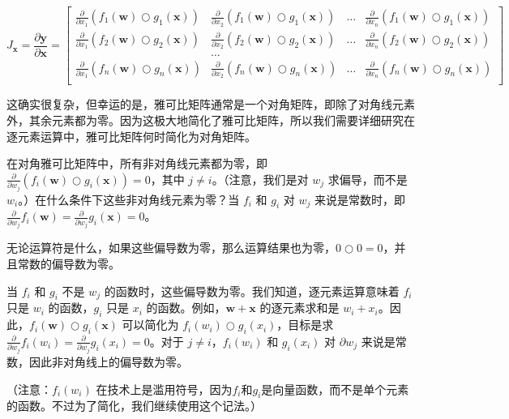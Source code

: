 \documentclass[11pt]{article}
\begin{document}
\[
J_\mathbf{x} = 
\frac{\partial \mathbf{y}}{\partial \mathbf{x}}  = \begin{bmatrix}
\frac{\partial}{\partial x_1} ( f_{1}(\mathbf{w}) \bigcirc g_{1}(\mathbf{x}) ) & \frac{\partial}{\partial x_2} ( f_{1}(\mathbf{w}) \bigcirc g_{1}(\mathbf{x}) ) & \ldots & \frac{\partial}{\partial x_n} ( f_{1}(\mathbf{w}) \bigcirc g_{1}(\mathbf{x}) )\\
\frac{\partial}{\partial x_1} ( f_{2}(\mathbf{w}) \bigcirc g_{2}(\mathbf{x}) ) & \frac{\partial}{\partial x_2} ( f_{2}(\mathbf{w}) \bigcirc g_{2}(\mathbf{x}) ) & \ldots & \frac{\partial}{\partial x_n} ( f_{2}(\mathbf{w}) \bigcirc g_{2}(\mathbf{x}) )\\
& \ldots\\
\frac{\partial}{\partial x_1} ( f_{n}(\mathbf{w}) \bigcirc g_{n}(\mathbf{x}) ) & \frac{\partial}{\partial x_2} ( f_{n}(\mathbf{w}) \bigcirc g_{n}(\mathbf{x}) ) & \ldots & \frac{\partial}{\partial x_n} ( f_{n}(\mathbf{w}) \bigcirc g_{n}(\mathbf{x}) )\\
\end{bmatrix}
\]

这确实很复杂，但幸运的是，雅可比矩阵通常是一个对角矩阵，即除了对角线元素外，其余元素都为零。因为这极大地简化了雅可比矩阵，所以我们需要详细研究在逐元素运算中，雅可比矩阵何时简化为对角矩阵。

在对角雅可比矩阵中，所有非对角线元素都为零，即 $\frac{\partial}{\partial w_j} ( f_i(\mathbf{w}) \bigcirc g_i(\mathbf{x}) ) = 0$，其中 $j \neq i$。（注意，我们是对 $w_j$ 求偏导，而不是 $w_i$。）在什么条件下这些非对角线元素为零？当 $f_i$ 和 $g_i$ 对 $w_j$ 来说是常数时，即 $\frac{\partial}{\partial w_j} f_i(\mathbf{w}) = \frac{\partial}{\partial w_j} g_i(\mathbf{x}) = 0$。

无论运算符是什么，如果这些偏导数为零，那么运算结果也为零，$0 \bigcirc 0 = 0$，并且常数的偏导数为零。

当 $f_i$ 和 $g_i$ 不是 $w_j$ 的函数时，这些偏导数为零。我们知道，逐元素运算意味着 $f_i$ 只是 $w_i$ 的函数，$g_i$ 只是 $x_i$ 的函数。例如，$\mathbf{w} + \mathbf{x}$ 的逐元素求和是 $w_i + x_i$。因此，$f_i(\mathbf{w}) \bigcirc g_i(\mathbf{x})$ 可以简化为 $f_i(w_i) \bigcirc g_i(x_i)$，目标是求 $\frac{\partial}{\partial w_j} f_i(w_i) = \frac{\partial}{\partial w_j} g_i(x_i) = 0$。对于 $j \neq i$，$f_i(w_i)$ 和 $g_i(x_i)$ 对 $\partial w_j$ 来说是常数，因此非对角线上的偏导数为零。

（注意：$f_i(w_i)$ 在技术上是滥用符号，因为$f_i$和$g_i$是向量函数，而不是单个元素的函数。不过为了简化，我们继续使用这个记法。）
\end{document}
